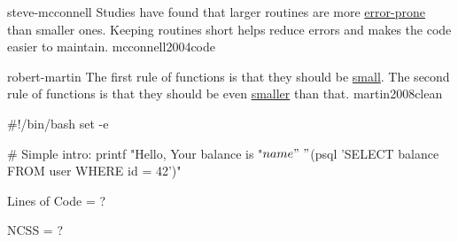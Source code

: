 \documentclass{article}
\begin{document}
\qte
  {steve-mcconnell}
  {Studies have found that larger routines are more \ul{error-prone} than smaller ones. Keeping routines short helps reduce errors and makes the code easier to maintain.}
  {mcconnell2004code}

\qte
  {robert-martin}
  {The first rule of functions is that they should be \ul{small}. The second rule of functions is that they should be even \ul{smaller} than that.}
  {martin2008clean}




\begin{multicols}{2}
{\small\begin{ffcode}
#!/bin/bash
set -e

# Simple intro:
printf "Hello, %
  Your balance is %
  "${name}" \
  "$(psql 'SELECT balance
    FROM user WHERE id = 42')"
\end{ffcode}
}
\par\columnbreak\par
Lines of Code = ?
\par
NCSS = ?
\end{multicols}
\plush{}

\end{document}
